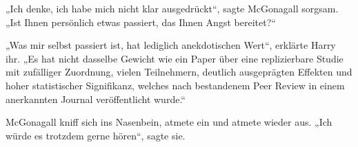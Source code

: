 „Ich denke, ich habe mich nicht klar ausgedrückt“, sagte McGonagall sorgsam. „Ist Ihnen persönlich etwas passiert, das Ihnen Angst bereitet?“

„Was mir selbst passiert ist, hat lediglich anekdotischen Wert“, erklärte Harry ihr. „Es hat nicht dasselbe Gewicht wie ein Paper über eine replizierbare Studie mit zufälliger Zuordnung, vielen Teilnehmern, deutlich ausgeprägten Effekten und hoher statistischer Signifikanz, welches nach bestandenem Peer Review in einem anerkannten Journal veröffentlicht wurde.“

McGonagall kniff sich ins Nasenbein, atmete ein und atmete wieder aus. „Ich würde es trotzdem gerne hören“, sagte sie.

